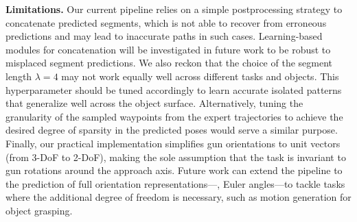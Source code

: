 \noindent\textbf{Limitations.}  Our current pipeline relies on a simple postprocessing strategy to concatenate predicted segments, which is not able to recover from erroneous predictions and may lead to inaccurate paths in such cases. Learning-based modules for concatenation will be investigated in future work to be robust to misplaced segment predictions.
We also reckon that the choice of the segment length $\lambda{=}4$ may not work equally well across different tasks and objects.
This hyperparameter should be tuned accordingly to learn accurate isolated patterns that generalize well across the object surface.
%
Alternatively, tuning the granularity of the sampled waypoints from the expert trajectories to achieve the desired degree of sparsity in the predicted poses would serve a similar purpose.
Finally, our practical implementation simplifies gun orientations to unit vectors (from 3-DoF to 2-DoF), making the sole assumption that the task is invariant to gun rotations around the approach axis.
%
Future work can extend the pipeline to the prediction of full orientation representations---\eg, Euler angles---to tackle tasks where the additional degree of freedom is necessary, such as motion generation for object grasping.